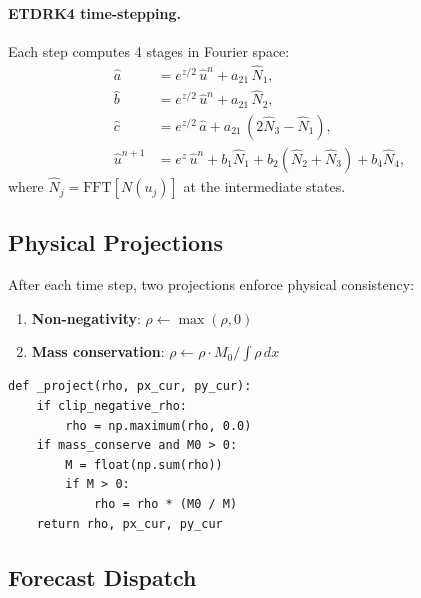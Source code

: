 \documentclass[11pt]{article}
\begin{document}
\paragraph{ETDRK4 time-stepping.}
Each step computes 4 stages in Fourier space:
\begin{align}
  \hat{a} &= e^{z/2}\,\hat{u}^n + a_{21}\,\hat{N}_1, \\
  \hat{b} &= e^{z/2}\,\hat{u}^n + a_{21}\,\hat{N}_2, \\
  \hat{c} &= e^{z/2}\,\hat{a} + a_{21}\,(2\hat{N}_3 - \hat{N}_1), \\
  \hat{u}^{n+1} &= e^z\,\hat{u}^n + b_1\hat{N}_1 + b_2(\hat{N}_2+\hat{N}_3) + b_4\hat{N}_4,
\end{align}
where $\hat{N}_j = \text{FFT}[N(u_j)]$ at the intermediate states.


\subsection{Physical Projections}

After each time step, two projections enforce physical consistency:
\begin{enumerate}
  \item \textbf{Non-negativity}: $\rho \leftarrow \max(\rho, 0)$
  \item \textbf{Mass conservation}: $\rho \leftarrow \rho \cdot M_0 / \!\int\!\rho\,dx$
\end{enumerate}

\begin{lstlisting}[caption={multifield.py --- physical projections}]
def _project(rho, px_cur, py_cur):
    if clip_negative_rho:
        rho = np.maximum(rho, 0.0)
    if mass_conserve and M0 > 0:
        M = float(np.sum(rho))
        if M > 0:
            rho = rho * (M0 / M)
    return rho, px_cur, py_cur
\end{lstlisting}


\subsection{Forecast Dispatch}
\end{document}
